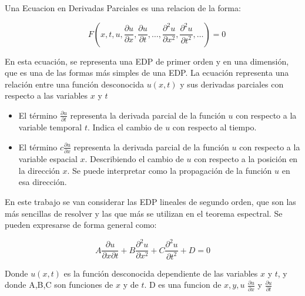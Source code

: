 \documentclass{article}
\begin{document}
    Una Ecuacion en Derivadas Parciales es una relacion de la forma:
    
    \begin{equation}
        \quad F\left(x, t, u, \frac{\partial u}{\partial x}, \frac{\partial u}{\partial t}, \ldots, \frac{\partial^2 u}{\partial x^2}, \frac{\partial^2 u}{\partial t^2}, \ldots\right) = 0
        \end{equation}
        
        En esta ecuación, se representa una EDP de primer orden y en una dimensión, que es una de las formas más simples de una EDP. La ecuación representa una relación entre una función desconocida $u(x,t)$ y sus derivadas parciales con respecto a las variables $x$ y $t$
            
        \begin{itemize}
            \item El término $\frac{\partial u}{\partial t}$ representa la derivada parcial de la función $u$ con respecto a la variable temporal $t$. Indica el cambio de $u$ con respecto al tiempo.
            
            \item El término $c\frac{\partial u}{\partial x}$ representa la derivada parcial de la función $u$ con respecto a la variable espacial $x$. Describiendo el cambio de $u$ con respecto a la posición en la dirección $x$. Se puede interpretar como la propagación de la función $u$ en esa dirección.

        \end{itemize}

 
        En este trabajo se van considerar las EDP lineales de segundo orden, que son las más sencillas de resolver y las que más se utilizan en el teorema espectral. Se pueden expresarse de forma general como:

        \begin{equation}
        A\frac{\partial u}{\partial x\partial t}+B\frac{\partial^2 u}{\partial x^2} +C\frac{\partial^2 u}{\partial t^2} +D= 0
        \end{equation}
        
        Donde $u(x,t)$ es la función desconocida dependiente de las variables $x$ y $t$, y donde A,B,C son funciones de $x$ y de $t$. D es una funcion de $x,y,u$ $\frac{\partial u}{\partial x}$ y $\frac{\partial u}{\partial t}$
\end{document}
